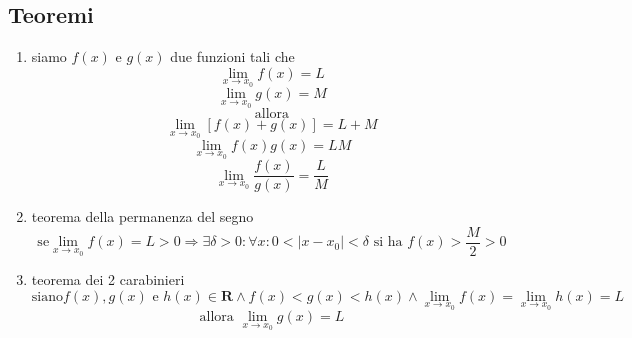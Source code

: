\documentclass{exam}
\begin{document}
  \subsection{Teoremi}
    \begin{enumerate}
      \item siamo $f(x)$ e $g(x)$ due funzioni tali che
        \begin{displaymath}
          \lim_{x\to x_{0}}f(x)=L
        \end{displaymath}
        \begin{displaymath}
          \lim_{x\to x_{0}}g(x)=M
        \end{displaymath}
        \begin{displaymath}
          \textrm{allora}
        \end{displaymath}
        \begin{displaymath}
          \lim_{x \to x_{0}} [f(x)+g(x)]= L+M
        \end{displaymath}
        \begin{displaymath}
          \lim_{x \to x_{0}} f(x)g(x)=LM
        \end{displaymath}
        \begin{displaymath}
          \lim_{x\to x_{0}} \frac{f(x)}{g(x)}=\frac{L}{M}
        \end{displaymath}
      \item{teorema della permanenza del segno}
        \begin{displaymath}
          \textrm{se} \lim_{x\to x_{0}} f(x)=L>0 \Rightarrow \exists \delta >0 : \forall x :
          0<|x-x_{0}|<\delta \textrm{ si ha } f(x)>\frac{M}{2}>0
        \end{displaymath}
      \item{teorema dei 2 carabinieri}
        \begin{displaymath}
          \textrm{siano} f(x),g(x)\textrm{ e } h(x) \in \mathbf{R} \land f(x)<g(x)<h(x) 
          \land \lim_{x \to x_{0}}f(x)=\lim_{x \to x_{0}}h(x)=L
        \end{displaymath}
        \begin{displaymath}
          \textrm{allora }\lim_{x \to x_{0}}g(x)=L
        \end{displaymath}
    \end{enumerate}
  
  
\end{document}
